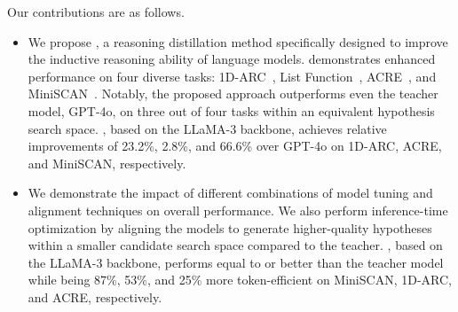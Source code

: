 Our contributions are as follows.
\begin{itemize}
    \item We propose \proposed, a reasoning distillation method specifically designed to improve the inductive reasoning ability of language models. \proposed demonstrates enhanced performance on four diverse tasks: 1D-ARC~\citep{xu2024llmsabstractionreasoningcorpus}, List Function~\citep{rule2020child}, ACRE~\citep{zhang2021acreabstractcausalreasoning}, and MiniSCAN~\citep{lake2019humanfewshotlearningcompositional}. Notably, the proposed approach outperforms even the teacher model, GPT-4o, on three out of four tasks within an equivalent hypothesis search space. \proposed, based on the LLaMA-3 backbone, achieves relative improvements of 23.2\%, 2.8\%, and 66.6\% over GPT-4o on 1D-ARC, ACRE, and MiniSCAN, respectively.
    
    \item We demonstrate the impact of different combinations of model tuning and alignment techniques on overall performance. We also perform inference-time optimization by aligning the models to generate higher-quality hypotheses within a smaller candidate search space compared to the teacher. \proposed, based on the LLaMA-3 backbone, performs equal to or better than the teacher model while being 87\%, 53\%, and 25\% more token-efficient on MiniSCAN, 1D-ARC, and ACRE, respectively.
\end{itemize}

